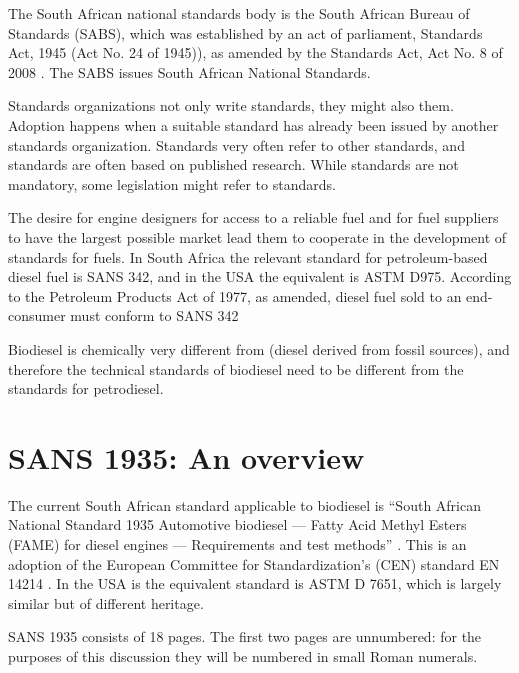 The South African national standards body is the South African Bureau of
Standards (SABS), which was established by an act of parliament,
 Standards Act, 1945 (Act No. 24 of 1945)), as amended by the Standards Act, Act
 No. 8 of 2008 \autocite{Act8-2008}. The SABS issues South African National
 Standards.

Standards organizations not only write standards, they might also
 them. Adoption happens when a suitable standard has already been
issued by another standards organization. Standards very often refer to other
standards, and standards are often based on published research. While standards
are not mandatory, some legislation might refer to standards. 

The desire for engine designers for access to a reliable fuel and for fuel
suppliers to have the largest possible market lead them to cooperate in the
development of standards for fuels. In South Africa the relevant standard for
petroleum-based diesel fuel is SANS 342, and in the USA the equivalent is ASTM
D975. According to the Petroleum Products Act of 1977, as amended, diesel fuel
sold to an end-consumer must conform to SANS 342

Biodiesel is chemically very different from  (diesel
derived from fossil sources), and therefore the technical standards of biodiesel
need to be different from the standards for petrodiesel.

\section{SANS 1935: An overview}

The current South African standard applicable to biodiesel is ``South African
National Standard 1935 Automotive biodiesel — Fatty Acid Methyl Esters (FAME)
for diesel engines — Requirements and test methods'' \autocite{SANS1935}. This
is an adoption of the European Committee for Standardization's (CEN) standard EN
14214 \autocite{EN14214}. In the USA is the equivalent standard is ASTM D 7651,
which is largely similar but of different heritage.

SANS 1935 consists of 18 pages. The first two pages are unnumbered: for the
purposes of this discussion they will be numbered in small Roman numerals.

